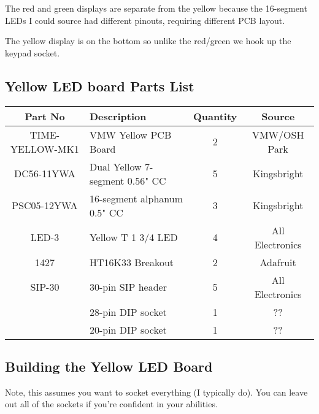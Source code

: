 \documentclass[11pt]{article}
\begin{document}
The red and green displays are separate from the yellow because
the 16-segment LEDs I could source had different pinouts, requiring
different PCB layout.

The yellow display is on the bottom so unlike the red/green we
hook up the keypad socket.

\subsection{Yellow LED board Parts List}

\begin{tabular}{|c|l|c|c|}
\hline
Part No   &  Description    &  Quantity    &   Source \\
\hline
\hline
TIME-YELLOW-MK1& VMW Yellow PCB Board          & 2 & VMW/OSH Park\\ %
\hline
DC56-11YWA     & Dual Yellow 7-segment 0.56" CC& 5 & Kingsbright\\ %
\hline
PSC05-12YWA    & 16-segment alphanum 0.5" CC   & 3 & Kingsbright\\ %
\hline
LED-3          & Yellow T 1 3/4 LED            & 4 & All Electronics\\ %
\hline
1427           & HT16K33 Breakout              & 2 & Adafruit\\ %
\hline
SIP-30	       & 30-pin SIP header             & 5 & All Electronics\\ %
\hline
               & 28-pin DIP socket             & 1 & ?? \\ %
\hline
               & 20-pin DIP socket             & 1 & ?? \\ %
\hline
\end{tabular}


\subsection{Building the Yellow LED Board}

Note, this assumes you want to socket everything (I typically do).
You can leave out all of the sockets if you're confident in your
abilities.
\end{document}

